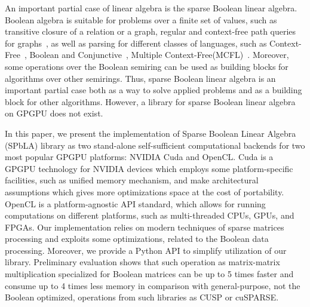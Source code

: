 An important partial case of linear algebra is the sparse Boolean linear algebra.
Boolean algebra is suitable for problems over a finite set of values, such as transitive closure of a relation or a graph, regular and context-free path queries for graphs~\cite{10.1145/3210259.3210264}, as well as parsing for different classes of languages, such as Context-Free~\cite{10.1016/S0022-0000(75)80046-8}, Boolean and Conjunctive~\cite{OKHOTIN2014101}, Multiple Context-Free(MCFL)~\cite{10.5555/972525.972527}.
Moreover, some operations over the Boolean semiring can be used as building blocks for algorithms over other semirings.
Thus, sparse Boolean linear algebra is an important partial case both as a way to solve applied problems and as a building block for other algorithms.
However, a library for sparse Boolean linear algebra on GPGPU does not exist.

In this paper, we present the implementation of Sparse Boolean Linear Algebra (SPbLA) library as two stand-alone self-sufficient computational backends for two most popular GPGPU platforms: NVIDIA Cuda
 and OpenCL. %
Cuda is a GPGPU technology for NVIDIA devices which employs some platform-specific facilities, such as unified memory mechanism, and make architectural assumptions which gives more optimizations space at the cost of portability.
OpenCL is a platform-agnostic API standard, which allows for running computations on different platforms, such as multi-threaded CPUs, GPUs, and FPGAs.
Our implementation relies on modern techniques of sparse matrices processing and exploits some optimizations, related to the Boolean data processing.
Moreover, we provide a Python API to simplify utilization of our library.
Preliminary evaluation shows that such operation as matrix-matrix multiplication specialized for Boolean matrices can be up to 5 times faster and consume up to 4 times less memory in comparison with general-purpose, not the Boolean optimized, operations from such libraries as CUSP or cuSPARSE.